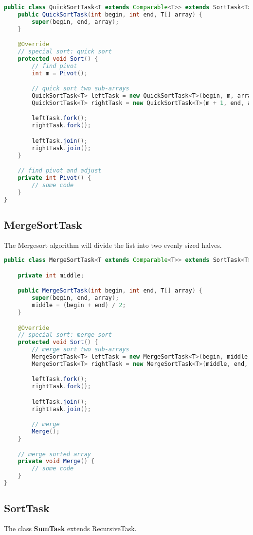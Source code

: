 \documentclass{article}
\begin{document}
\begin{lstlisting}[language=java, caption={QuickSortTask}]
public class QuickSortTask<T extends Comparable<T>> extends SortTask<T> {
    public QuickSortTask(int begin, int end, T[] array) {
        super(begin, end, array);
    }

    @Override
    // special sort: quick sort
    protected void Sort() {
        // find pivot
        int m = Pivot();

        // quick sort two sub-arrays
        QuickSortTask<T> leftTask = new QuickSortTask<T>(begin, m, array);
        QuickSortTask<T> rightTask = new QuickSortTask<T>(m + 1, end, array);

        leftTask.fork();
        rightTask.fork();

        leftTask.join();
        rightTask.join();
    }

    // find pivot and adjust
    private int Pivot() {
        // some code
    }
}
\end{lstlisting}

\subsection*{MergeSortTask}
The Mergesort algorithm will divide the list into
two evenly sized halves.

\begin{lstlisting}[language=java, caption={MergeSortTask}]
public class MergeSortTask<T extends Comparable<T>> extends SortTask<T> {

    private int middle;

    public MergeSortTask(int begin, int end, T[] array) {
        super(begin, end, array);
        middle = (begin + end) / 2;
    }

    @Override
    // special sort: merge sort
    protected void Sort() {
        // merge sort two sub-arrays
        MergeSortTask<T> leftTask = new MergeSortTask<T>(begin, middle, array);
        MergeSortTask<T> rightTask = new MergeSortTask<T>(middle, end, array);

        leftTask.fork();
        rightTask.fork();

        leftTask.join();
        rightTask.join();

        // merge
        Merge();
    }

    // merge sorted array
    private void Merge() {
        // some code
    }
}
\end{lstlisting}

\subsection*{SortTask}
The class \textbf{SumTask} extends RecursiveTask. 
\end{document}
